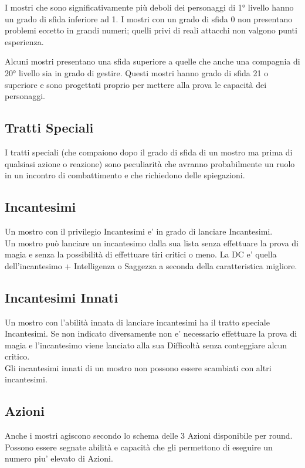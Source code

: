\begin{multicols}{2}
I mostri che sono significativamente più deboli dei personaggi di 1° livello hanno un grado di sfida inferiore ad 1. I mostri con un grado di sfida 0 non presentano problemi eccetto in grandi numeri; quelli privi di reali attacchi non valgono punti esperienza.

Alcuni mostri presentano una sfida superiore a quelle che anche una compagnia di 20° livello sia in grado di gestire. Questi mostri hanno grado di sfida 21 o superiore e sono progettati proprio per mettere alla prova le capacità dei personaggi.


\subsection{Tratti Speciali}

I tratti speciali (che compaiono dopo il grado di sfida di un mostro ma prima di qualsiasi azione o reazione) sono peculiarità che avranno probabilmente un ruolo in un incontro di combattimento e che richiedono delle spiegazioni.

\subsection{Incantesimi}

Un mostro con il privilegio Incantesimi e' in grado di lanciare Incantesimi.\\
Un mostro può lanciare un incantesimo dalla sua lista senza effettuare la prova di magia e senza la possibilità di effettuare tiri critici o meno. La DC e' quella dell'incantesimo + Intelligenza o Saggezza a seconda della caratteristica migliore.

\subsection{Incantesimi Innati}

Un mostro con l'abilità innata di lanciare incantesimi ha il tratto speciale Incantesimi.
Se non indicato diversamente non e' necessario effettuare la prova di magia e l'incantesimo viene lanciato alla sua Difficoltà senza conteggiare alcun critico.\\
Gli incantesimi innati di un mostro non possono essere scambiati con altri incantesimi. 

\subsection{Azioni}

Anche i mostri agiscono secondo lo schema delle 3 Azioni disponibile per round. Possono essere segnate abilità e capacità che gli permettono di eseguire un numero piu' elevato di Azioni.


\end{multicols}
